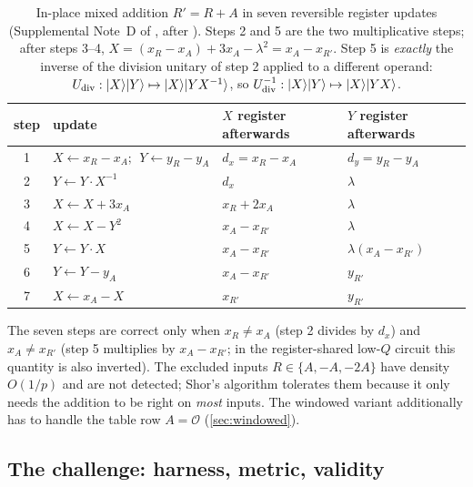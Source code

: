 \begin{table}[H]
\centering\small
\begin{tabular}{@{}clll@{}}
\toprule
step & update & $X$ register afterwards & $Y$ register afterwards\\
\midrule
1 & $X\gets x_R-x_A;\ \ Y\gets y_R-y_A$ & $d_x=x_R-x_A$ & $d_y=y_R-y_A$\\
2 & $Y\gets Y\cdot X^{-1}$ & $d_x$ & $\lambda$\\
3 & $X\gets X+3x_A$ & $x_R+2x_A$ & $\lambda$\\
4 & $X\gets X-Y^2$ & $x_A-x_{R'}$ & $\lambda$\\
5 & $Y\gets Y\cdot X$ & $x_A-x_{R'}$ & $\lambda(x_A-x_{R'})$\\
6 & $Y\gets Y-y_A$ & $x_A-x_{R'}$ & $y_{R'}$\\
7 & $X\gets x_A-X$ & $x_{R'}$ & $y_{R'}$\\
\bottomrule
\end{tabular}
\caption{In-place mixed addition $R'=R+A$ in seven reversible register updates (Supplemental Note~D of \cite{ecdsafail26}, after \cite{schrottenloher26}). Steps 2 and 5 are the two multiplicative steps; after steps 3--4, $X=(x_R-x_A)+3x_A-\lambda^2=x_A-x_{R'}$. Step 5 is \emph{exactly} the inverse of the division unitary of step 2 applied to a different operand: $U_{\rm div}:\lvert X \rangle\lvert Y \rangle\mapsto\lvert X \rangle\lvert YX^{-1} \rangle$, so $U_{\rm div}^{-1}:\lvert X \rangle\lvert Y \rangle\mapsto\lvert X \rangle\lvert YX \rangle$.}
\label{tab:seven-steps}
\end{table}

\begin{warnbox}[title={The generic-case domain}]
The seven steps are correct only when $x_R\neq x_A$ (step 2 divides by $d_x$) and $x_A\neq x_{R'}$ (step 5 multiplies by $x_A-x_{R'}$; in the register-shared low-$Q$ circuit this quantity is also inverted). The excluded inputs $R\in\{A,-A,-2A\}$ have density $O(1/p)$ and are not detected; Shor's algorithm tolerates them because it only needs the addition to be right on \emph{most} inputs. The windowed variant additionally has to handle the table row $A=\mathcal O$ (\cref{sec:windowed}).
\end{warnbox}

\subsection{The \ecdsafail{} challenge: harness, metric, validity}\label{sec:challenge}

